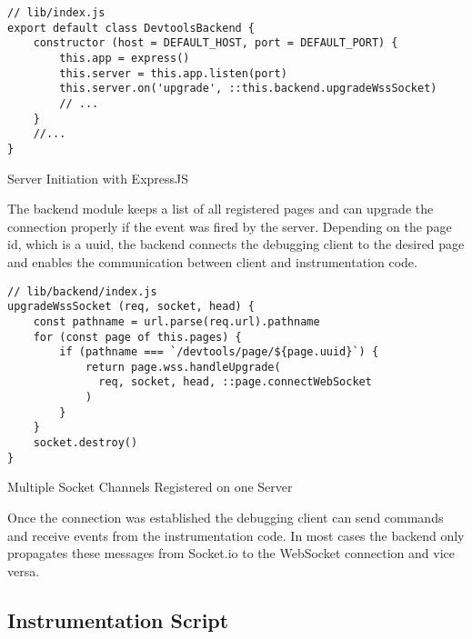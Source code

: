 \begin{listing}[H]
\begin{verbatim}
// lib/index.js
export default class DevtoolsBackend {
    constructor (host = DEFAULT_HOST, port = DEFAULT_PORT) {
        this.app = express()
        this.server = this.app.listen(port)
        this.server.on('upgrade', ::this.backend.upgradeWssSocket)
        // ...
    }
    //...
}
\end{verbatim}
\caption{Server Initiation with ExpressJS}
\label{lst:socketUpgrade}
\end{listing}

The backend module keeps a list of all registered pages and can upgrade the connection properly if
the event was fired by the server. Depending on the page id, which is a uuid, the backend connects the
debugging client to the desired page and enables the communication between client and instrumentation
code.

\begin{listing}[H]
\begin{verbatim}
// lib/backend/index.js
upgradeWssSocket (req, socket, head) {
    const pathname = url.parse(req.url).pathname
    for (const page of this.pages) {
        if (pathname === `/devtools/page/${page.uuid}`) {
            return page.wss.handleUpgrade(
              req, socket, head, ::page.connectWebSocket
            )
        }
    }
    socket.destroy()
}
\end{verbatim}
\caption{Multiple Socket Channels Registered on one Server}
\label{lst:socket}
\end{listing}

Once the connection was established the debugging client can send commands and receive events from
the instrumentation code. In most cases the backend only propagates these messages from Socket.io
to the WebSocket connection and vice versa.

\subsection{Instrumentation Script}

